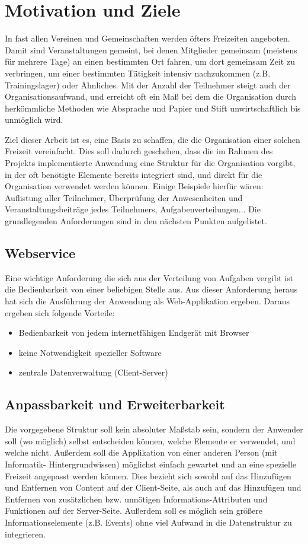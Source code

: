 \section{Motivation und Ziele}
In fast allen Vereinen und Gemeinschaften werden öfters Freizeiten angeboten. Damit sind Veranstaltungen gemeint, bei denen Mitglieder gemeinsam (meistens für mehrere Tage) an einen bestimmten Ort fahren, um dort gemeinsam Zeit zu verbringen, um einer bestimmten Tätigkeit intensiv nachzukommen (z.B. Trainingslager)  oder Ähnliches. Mit der Anzahl der Teilnehmer steigt auch der Organisationsaufwand, und erreicht oft ein Maß bei dem die Organisation durch herkömmliche Methoden wie Absprache und \glqq{}Papier und Stift\grqq{}  unwirtschaftlich bis unmöglich wird. 

Ziel dieser Arbeit ist es, eine Basis zu schaffen, die die Organisation einer solchen Freizeit vereinfacht. Dies soll dadurch geschehen, dass die im Rahmen des Projekts implementierte Anwendung eine Struktur für die Organisation vorgibt, in der oft benötigte Elemente bereits integriert sind, und direkt für die Organisation verwendet werden können. Einige Beispiele hierfür wären: Auflistung aller Teilnehmer, Überprüfung der Anwesenheiten und Veranstaltungsbeiträge jedes Teilnehmers, Aufgabenverteilungen... 
Die grundlegenden Anforderungen sind in den nächsten Punkten aufgelistet. 

\subsection{Webservice}
Eine wichtige Anforderung die sich aus der Verteilung von Aufgaben vergibt ist die Bedienbarkeit von einer beliebigen Stelle aus. Aus dieser Anforderung heraus hat sich die Ausführung der Anwendung als Web-Applikation ergeben. Daraus ergeben sich folgende Vorteile:

\begin{itemize}
	\item Bedienbarkeit von jedem internetfähigen Endgerät mit Browser
	\item keine Notwendigkeit spezieller Software
	\item zentrale Datenverwaltung (Client-Server)
\end{itemize}

\subsection{Anpassbarkeit und Erweiterbarkeit}
Die vorgegebene Struktur soll kein absoluter Maßstab sein, sondern der Anwender soll (wo möglich) selbst entscheiden können, welche Elemente er verwendet, und welche nicht.
Außerdem soll die Applikation von einer anderen Person (mit Informatik- Hintergrundwissen) möglichst einfach gewartet und an eine spezielle Freizeit angepasst werden können. Dies bezieht sich sowohl auf das Hinzufügen und Entfernen von Content auf der Client-Seite, als auch auf das Hinzufügen und Entfernen von zusätzlichen bzw. unnötigen Informations-Attributen und Funktionen auf der Server-Seite. Außerdem soll es möglich sein größere Informationselemente (z.B. Events) ohne viel Aufwand in die Datenstruktur zu integrieren.

